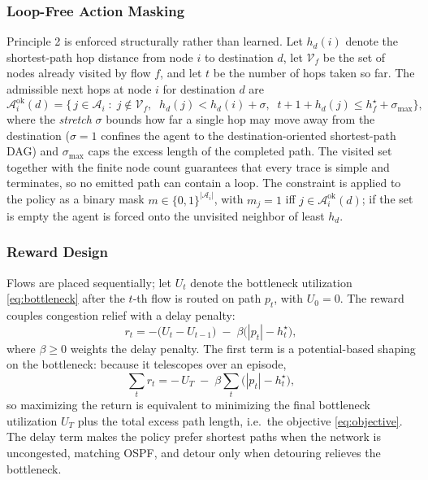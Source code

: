 \subsubsection{Loop-Free Action Masking}\label{sec:mask}
Principle 2 is enforced structurally rather than learned. Let $h_d(i)$ denote
the shortest-path hop distance from node $i$ to destination $d$, let
$\mathcal{V}_f$ be the set of nodes already visited by flow $f$, and let $t$ be
the number of hops taken so far. The admissible next hops at node $i$ for
destination $d$ are
\begin{equation}\label{eq:mask}
\mathcal{A}^{\mathrm{ok}}_i(d)=\bigl\{\,j\in\mathcal{A}_i \;:\;
j\notin\mathcal{V}_f,\;\; h_d(j)<h_d(i)+\sigma,\;\;
t+1+h_d(j)\le h^{\star}_f+\sigma_{\max}\bigr\},
\end{equation}
where the \emph{stretch} $\sigma$ bounds how far a single hop may move away
from the destination ($\sigma=1$ confines the agent to the destination-oriented
shortest-path DAG) and $\sigma_{\max}$ caps the excess length of the completed
path. The visited set together with the finite node count guarantees that every
trace is simple and terminates, so no emitted path can contain a loop. The
constraint is applied to the policy as a binary mask
$m\in\{0,1\}^{|\mathcal{A}_i|}$, with $m_j=1$ iff
$j\in\mathcal{A}^{\mathrm{ok}}_i(d)$; if the set is empty the agent is forced
onto the unvisited neighbor of least $h_d$.

\subsubsection{Reward Design}
Flows are placed sequentially; let $U_t$ denote the bottleneck utilization
\eqref{eq:bottleneck} after the $t$-th flow is routed on path $p_t$, with
$U_0=0$. The reward couples congestion relief with a delay penalty:
\begin{equation}\label{eq:reward}
r_t=-\bigl(U_t-U_{t-1}\bigr)\;-\;\beta\bigl(|p_t|-h^{\star}_t\bigr),
\end{equation}
where $\beta\ge 0$ weights the delay penalty. The first term is a
potential-based shaping on the bottleneck: because it telescopes over an
episode,
\begin{equation}\label{eq:telescope}
\sum_{t} r_t=-\,U_T\;-\;\beta\sum_{t}\bigl(|p_t|-h^{\star}_t\bigr),
\end{equation}
so maximizing the return is equivalent to minimizing the final bottleneck
utilization $U_T$ plus the total excess path length, i.e.\ the objective
\eqref{eq:objective}. The delay term makes the policy prefer shortest paths
when the network is uncongested, matching OSPF, and detour only when
detouring relieves the bottleneck.

